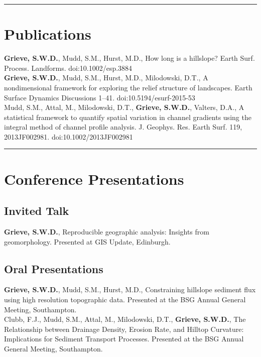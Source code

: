 \documentclass[10pt, a4paper]{article}
\newcommand{\years}[1]{\marginnote{\scriptsize #1}}
\begin{document}
\hrule
\section*{Publications}
\noindent

\years{2016}\textbf{Grieve, S.W.D.}, Mudd, S.M., Hurst, M.D., How long is a hillslope? Earth Surf. Process. Landforms. doi:10.1002/esp.3884\\[0.05cm]

\years{2016}\textbf{Grieve, S.W.D.}, Mudd, S.M., Hurst, M.D., Milodowski, D.T., A nondimensional framework for exploring the relief structure of landscapes. Earth Surface Dynamics Discussions 1–41. doi:10.5194/esurf-2015-53\\[0.05cm]

\years{2014}Mudd, S.M., Attal, M., Milodowski, D.T., \textbf{Grieve, S.W.D.}, Valters, D.A., A statistical framework to quantify spatial variation in channel gradients using the integral method of channel profile analysis. J. Geophys. Res. Earth Surf. 119, 2013JF002981. doi:10.1002/2013JF002981\\[0.05cm]

\hrule
\section*{Conference Presentations}
\noindent

\subsection*{Invited Talk}
\years{2015}\textbf{Grieve, S.W.D.}, Reproducible geographic analysis: Insights from geomorphology. Presented at GIS Update, Edinburgh.

\subsection*{Oral Presentations}

\years{2015}\textbf{Grieve, S.W.D.}, Mudd, S.M., Hurst, M.D., Constraining hillslope sediment flux using high resolution topographic data. Presented at the BSG Annual General Meeting, Southampton.\\[0.05cm]

\years{2015}Clubb, F.J., Mudd, S.M., Attal, M., Milodowski, D.T., \textbf{Grieve, S.W.D.}, The Relationship between Drainage Density, Erosion Rate, and Hilltop Curvature: Implications for Sediment Transport Processes. Presented at the BSG Annual General Meeting, Southampton.
\end{document}
